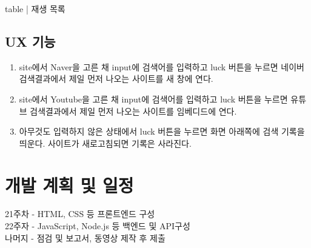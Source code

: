 \documentclass[a4paper, titlepage]{article}
\begin{document}
table | 재생 목록

\subsection{UX 기능}
\begin{enumerate}
    \item site에서 Naver을 고른 채 input에 검색어를 입력하고 luck 버튼을 누르면 네이버 검색결과에서 제일 먼저 나오는 사이트를 새 창에 연다.
    \item site에서 Youtube을 고른 채 input에 검색어를 입력하고 luck 버튼을 누르면 유튜브 검색결과에서 제일 먼저 나오는 사이트를 임베디드에 연다.
    \item 아무것도 입력하지 않은 상태에서 luck 버튼을 누르면 화면 아래쪽에 검색 기록을 띄운다. 사이트가 새로고침되면 기록은 사라진다.
\end{enumerate}


\section{개발 계획 및 일정}

21주차 - HTML, CSS 등 프론트엔드 구성\\
22주자 - JavaScript, Node.js 등 백엔드 및 API구성\\
나머지 - 점검 및 보고서, 동영상 제작 후 제출
\end{document}
